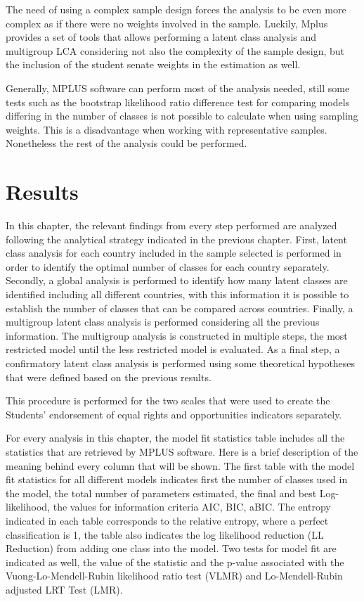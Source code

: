 \documentclass[12pt,a4paper,oneside]{reedthesis}
\begin{document}
The need of using a complex sample design forces the analysis to be even more complex as if there were no weights involved in the sample. Luckily, Mplus provides a set of tools that allows performing a latent class analysis and multigroup LCA considering not also the complexity of the sample design, but the inclusion of the student senate weights in the estimation as well.

Generally, MPLUS software can perform most of the analysis needed, still some tests such as the bootstrap likelihood ratio difference test for comparing models differing in the number of classes is not possible to calculate when using sampling weights. This is a disadvantage when working with representative samples. Nonetheless the rest of the analysis could be performed.

\clearpage

\hypertarget{results}{%
\chapter{Results}\label{results}}

In this chapter, the relevant findings from every step performed are analyzed following the analytical strategy indicated in the previous chapter. First, latent class analysis for each country included in the sample selected is performed in order to identify the optimal number of classes for each country separately. Secondly, a global analysis is performed to identify how many latent classes are identified including all different countries, with this information it is possible to establish the number of classes that can be compared across countries. Finally, a multigroup latent class analysis is performed considering all the previous information. The multigroup analysis is constructed in multiple steps, the most restricted model until the less restricted model is evaluated. As a final step, a confirmatory latent class analysis is performed using some theoretical hypotheses that were defined based on the previous results.

This procedure is performed for the two scales that were used to create the Students' endorsement of equal rights and opportunities indicators separately.

For every analysis in this chapter, the model fit statistics table includes all the statistics that are retrieved by MPLUS software. Here is a brief description of the meaning behind every column that will be shown. The first table with the model fit statistics for all different models indicates first the number of classes used in the model, the total number of parameters estimated, the final and best Log-likelihood, the values for information criteria AIC, BIC, aBIC. The entropy indicated in each table corresponds to the relative entropy, where a perfect classification is 1, the table also indicates the log likelihood reduction (LL Reduction) from adding one class into the model. Two tests for model fit are indicated as well, the value of the statistic and the p-value associated with the Vuong-Lo-Mendell-Rubin likelihood ratio test (VLMR) and Lo-Mendell-Rubin adjusted LRT Test (LMR).
\end{document}
